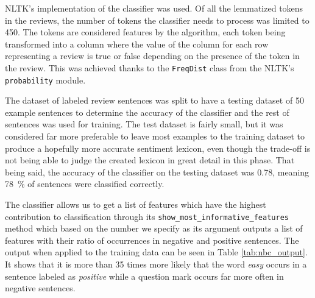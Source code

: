 NLTK's implementation of the classifier was used. Of all the lemmatized tokens in the reviews, the number of tokens the classifier needs to process was limited to 450. The tokens are considered features by the algorithm, each token being transformed into a column where the value of the column for each row representing a review is true or false depending on the presence of the token in the review. This was achieved thanks to the \texttt{FreqDist} class from the NLTK's \texttt{probability} module.

The dataset of labeled review sentences was split to have a testing dataset of 50 example sentences to determine the accuracy of the classifier and the rest of sentences was used for training. The test dataset is fairly small, but it was considered far more preferable to leave most examples to the training dataset to produce a hopefully more accurate sentiment lexicon, even though the trade-off is not being able to judge the created lexicon in great detail in this phase. 
That being said, the accuracy of the classifier on the testing dataset was 0.78, meaning 78~\% of sentences were classified correctly. 

The classifier allows us to get a list of features which have the highest contribution to classification through its \texttt{show\_most\_informative\_features} method which based on the number we specify as its argument outputs a list of features with their ratio of occurrences in negative and positive sentences. The output when applied to the training data can be seen in Table \ref{tab:nbc_output}. It shows that it is more than 35 times more likely that the word \textit{easy} occurs in a sentence labeled as \textit{positive} while a question mark occurs far more often in negative sentences.

